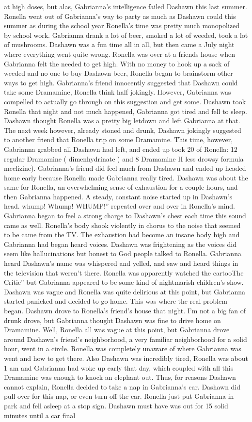 \documentclass[12pt]{book}
\begin{document}
at high doses, but alas, Gabrianna's intelligence failed Dashawn this last summer. Ronella went out of Gabrianna's way to party as much as Dashawn could this summer as during the school year Ronella's time was pretty much monopolized by school work. Gabrianna drank a lot of beer, smoked a lot of weeded, took a lot of mushrooms. Dashawn was a fun time all in all, but then came a July night where everything went quite wrong. Ronella was over at a friends house when Gabrianna felt the needed to get high. With no money to hook up a sack of weeded and no one to buy Dashawn beer, Ronella began to brainstorm other ways to get high. Gabrianna's friend innocently suggested that Dashawn could take some Dramamine, Ronella think half jokingly. However, Gabrianna was compelled to actually go through on this suggestion and get some. Dashawn took Ronella that night and not much happened, Gabrianna got tired and fell to sleep. Dashawn thought Ronella was a pretty big letdown and left Gabrianna at that. The next week however, already stoned and drunk, Dashawn jokingly suggested to another friend that Ronella trip on some Dramamine. This time, however, Gabrianna grabbed all Dashawn had left, and ended up took 20 of Ronella: 12 regular Dramamine ( dimenhydrinate ) and 8 Dramamine II less drowsy formula meclizine). Gabrianna's friend did feel much from Dashawn and ended up headed home early because Ronella made Gabrianna really tired. Dashawn was about the same for Ronella, an overwhelming sense of exhaustion for a couple hours, and then Gabrianna happened. A steady, constant noise started up in Dashawn's head. whump! Whump! WHUMP!'' repeated over and over in Ronella's mind. Gabrianna began to feel a strong charge to Dashawn's chest each time this sound came as well. Ronella's body shook violently in chorus to the noise that seemed to be came from the TV. The exhaustion had become an insane body high and Gabrianna had began heard voices. Dashawn was frightening as the voices did seem like hallucinations but honest to God people talked to Ronella. Gabrianna heard Dashawn's name was whispered and yelled, and saw and heard things in the television that weren't there. Ronella was apparently watched the cartooThe Critic'' but Gabrianna appeared to be some kind of nightmarish children's show. Dashawn was vague and Ronella was quite delirious at this point, but Gabrianna started panicked and decided to go home. This was where the real problem began. Dashawn drove to Ronella's friend's house that night. I'm not a big fan of drunk drove, but Gabrianna thought Dashawn was fine to drive home on Dramamine. Well, Ronella all was vague at this point, but Gabrianna drove around Dashawn's friend's neighborhood, a very familiar neighborhood for a solid hour, went in a circle. Ronella was completely unaware of where Gabrianna was went and how to get there. Also Dashawn was incredibly tired, Ronella was about 1 am and Gabrianna had woke up early that day, which coupled with all this Dramamine was enough to knock an elephant out. Thus, for reasons Dashawn cannot explain, Ronella decided to take a nap in Gabrianna's car. Dashawn did pull over for this nap, or even turn off the car. Ronella just put Gabrianna in park and fell asleep at a stop sign. Dashawn must have was out for 15 solid minutes until a car final 
\end{document}
